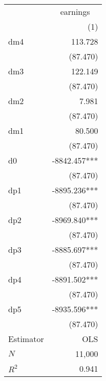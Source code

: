 \begin{tabular}{lr}
\toprule
          & \multicolumn{1}{c}{earnings} \\ 
\cmidrule(lr){2-2} 
          &                          (1) \\ 
\midrule
dm4       &                      113.728 \\ 
          &                     (87.470) \\ 
dm3       &                      122.149 \\ 
          &                     (87.470) \\ 
dm2       &                        7.981 \\ 
          &                     (87.470) \\ 
dm1       &                       80.500 \\ 
          &                     (87.470) \\ 
d0        &                 -8842.457*** \\ 
          &                     (87.470) \\ 
dp1       &                 -8895.236*** \\ 
          &                     (87.470) \\ 
dp2       &                 -8969.840*** \\ 
          &                     (87.470) \\ 
dp3       &                 -8885.697*** \\ 
          &                     (87.470) \\ 
dp4       &                 -8891.502*** \\ 
          &                     (87.470) \\ 
dp5       &                 -8935.596*** \\ 
          &                     (87.470) \\ 
\midrule
\midrule
Estimator &                          OLS \\ 
\midrule
$N$       &                       11,000 \\ 
$R^2$     &                        0.941 \\ 
\bottomrule
\end{tabular}
